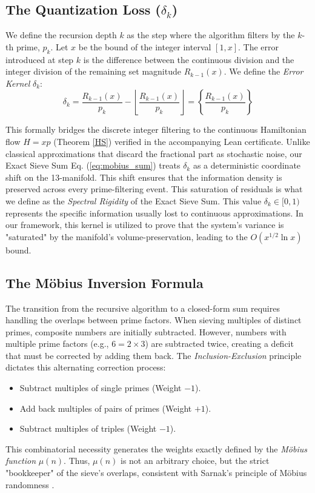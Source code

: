 \documentclass[sn-mathphys-num, pdflatex, referee]{sn-jnl}
\begin{document}
\subsection{The Quantization Loss (\texorpdfstring{$\delta_k$}{delta\_k})}
We define the recursion depth $k$ as the step where the algorithm filters by the $k$-th prime, $p_k$.
Let $x$ be the bound of the integer interval $[1, x]$. The error introduced at step $k$ is the difference between the continuous division and the integer division of the remaining set magnitude $R_{k-1}(x)$. We define the \textit{Error Kernel} $\delta_k$:
\begin{equation}
\delta_{k} = \frac{R_{k-1}(x)}{p_{k}} - \left\lfloor \frac{R_{k-1}(x)}{p_{k}} \right\rfloor = \left\{ \frac{R_{k-1}(x)}{p_{k}} \right\}
\label{eq:quantization}
\end{equation}

This formally bridges the discrete integer filtering to the continuous Hamiltonian flow $H=xp$ (Theorem \ref{HS}) verified in the accompanying Lean certificate.
Unlike classical approximations that discard the fractional part as stochastic noise, our Exact Sieve Sum Eq. (\ref{eq:mobius_sum}) treats $\delta_k$ as a deterministic coordinate shift on the 13-manifold. This shift ensures that the information density is preserved across every prime-filtering event. This saturation of residuals is what we define as the \textit{Spectral Rigidity} of the Exact Sieve Sum. This value $\delta_k \in [0, 1)$ represents the specific information usually lost to continuous approximations. In our framework, this kernel is utilized to prove that the system's variance is "saturated" by the manifold's volume-preservation, leading to the $O(x^{1/2}\ln x)$ bound.

\subsection{The Möbius Inversion Formula}
The transition from the recursive algorithm to a closed-form sum requires handling the overlaps between prime factors. When sieving multiples of distinct primes, composite numbers are initially subtracted. However, numbers with multiple prime factors (e.g., $6 = 2 \times 3$) are subtracted twice, creating a deficit that must be corrected by adding them back. The \textit{Inclusion-Exclusion} principle dictates this alternating correction process:
\begin{itemize}
    \item Subtract multiples of single primes (Weight $-1$).
    \item Add back multiples of pairs of primes (Weight $+1$).
    \item Subtract multiples of triples (Weight $-1$).
\end{itemize}
This combinatorial necessity generates the weights exactly defined by the \textit{Möbius function} $\mu(n)$. Thus, $\mu(n)$ is not an arbitrary choice, but the strict "bookkeeper" of the sieve's overlaps, consistent with Sarnak's principle of Möbius randomness \cite{sarnak}.
\end{document}
